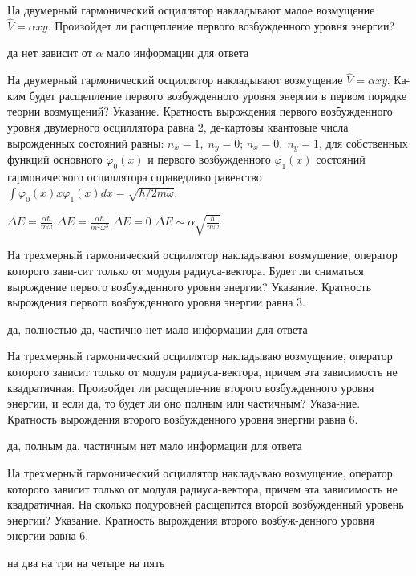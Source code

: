 \documentclass[11pt,a4paper]{exam}
\begin{document}
\begin{questions}
\question На двумерный гармонический осциллятор накладывают малое возмущение $\hat V = \alpha xy$. Произойдет ли расщепление первого возбужденного уровня энергии?
\begin{choices}
\choice да    
\choice нет      
\choice зависит от $\alpha $ 
\choice мало информации для ответа
\end{choices}

\question На двумерный гармонический осциллятор накладывают возмущение $\hat V = \alpha xy$. Ка-ким будет расщепление первого возбужденного уровня энергии в первом порядке теории возмущений? Указание. Кратность вырождения первого возбужденного уровня двумерного осциллятора равна 2, де-картовы квантовые числа вырожденных состояний равны: ${n_x} = 1,\;{n_y} = 0$; ${n_x} = 0,\;{n_y} = 1$, для собственных функций основного ${\varphi _0}(x)$ и первого возбужденного ${\varphi _1}(x)$ состояний гармонического осциллятора справедливо равенство $\int {{\varphi _0}(x)x{\varphi _1}(x)dx = } \sqrt {\hbar /2m\omega } $.
\begin{choices}
\choice $\Delta E = \frac{{\alpha \hbar }}{{m\omega }}$    
\choice $\Delta E = \frac{{\alpha \hbar }}{{{m^2}{\omega ^3}}}$     
\choice $\Delta E = 0$    
\choice $\Delta E \sim \alpha \sqrt {\frac{\hbar }{{m\omega }}} $
\end{choices}

\question На трехмерный гармонический осциллятор накладывают возмущение, оператор которого зави-сит только от модуля радиуса-вектора. Будет ли сниматься вырождение первого возбужденного уровня энергии? Указание. Кратность вырождения первого возбужденного уровня энергии равна 3.
\begin{choices}
\choice да, полностью  
\choice да, частично      
\choice нет      
\choice мало информации для ответа
\end{choices}

\question На трехмерный гармонический осциллятор накладываю возмущение, оператор которого зависит только от модуля радиуса-вектора, причем эта зависимость не квадратичная. Произойдет ли расщепле-ние второго возбужденного уровня энергии, и если да, то будет ли оно полным или частичным? Указа-ние. Кратность вырождения второго возбужденного уровня энергии равна 6.
\begin{choices}
\choice да, полным     
\choice да, частичным  
\choice нет      
\choice мало информации для ответа
\end{choices}

\question На трехмерный гармонический осциллятор накладываю возмущение, оператор которого зависит только от модуля радиуса-вектора, причем эта зависимость не квадратичная. На сколько подуровней расщепится второй возбужденный уровень энергии? Указание. Кратность вырождения второго возбуж-денного уровня энергии равна 6.
\begin{choices}
\choice на два      
\choice на три      
\choice на четыре   
\choice на пять
\end{choices}


\end{questions}
\end{document}
